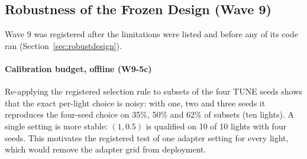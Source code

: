 \subsection{Robustness of the Frozen Design (Wave 9)}\label{sec:robust}
Wave 9 was registered after the limitations were listed and before any of its code ran (Section~\ref{sec:robustdesign}).
\paragraph{Calibration budget, offline (W9-5c)} Re-applying the registered selection rule to subsets of the four TUNE seeds shows that the
exact per-light choice is noisy: with one, two and three seeds it reproduces the four-seed choice on 35\%, 50\% and 62\% of subsets (ten
lights). A single setting is more stable: $(1,0.5)$ is qualified on 10 of 10 lights with four seeds. This motivates the registered test of
one adapter setting for every light, which would remove the adapter grid from deployment.
